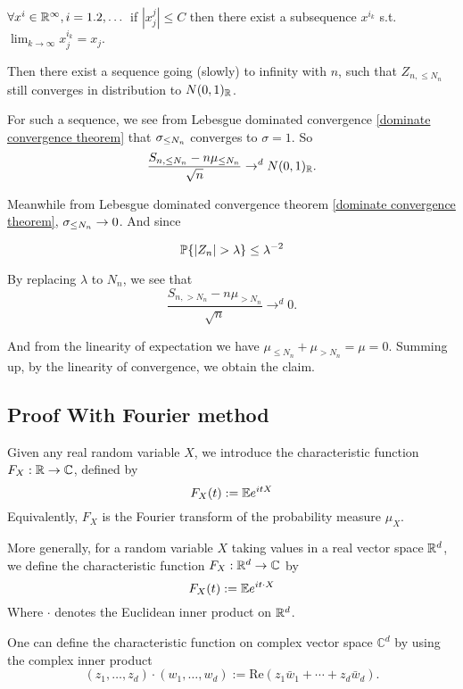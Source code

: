 \begin{lemma}
    $\forall x^i \in \mathbb{R}^\infty,i=1.2,\dots$ if $|x^j_j| \leq C$ then there exist a subsequence $x^{i_k}$ s.t. $\lim_{k\to \infty} x^{i_{k}}_j =x_j$.
\end{lemma}

Then there exist a sequence going (slowly) to infinity with $n$, such that $Z_{n,\leq N_n}$ still converges in distribution to $N(0,1)_{\mathbb{R}}$. 

For such a sequence, we see from Lebesgue dominated convergence \ref{dominate convergence theorem} that $\sigma_{\leq N_n}$ converges to $\sigma=1$. So 
\begin{equation*}
    \frac{S_{n,\leq N_n}-n\mu_{\leq N_n}}{\sqrt{n}} \to^d N(0,1)_{\mathbb{R}}.
\end{equation*}

Meanwhile from Lebesgue dominated convergence theorem \ref{dominate convergence theorem}, $\sigma_{\leq N_n}\to 0$. And since 

\begin{equation*}
    \Pb\{|Z_n|>\lambda\} \leq \lambda^{-2}
\end{equation*}

By replacing $\lambda$ to $N_n$, we see that
\begin{equation*}
    \frac{S_{n,> N_n}-n\mu_{>N_n}}{\sqrt{n}} \to^d 0.
\end{equation*}

And from the linearity of expectation we have $\mu_{\leq N_n}+\mu_{>N_n} =\mu =0$. Summing up, by the linearity of convergence, we obtain the claim. 


\subsection{Proof With Fourier method}

\begin{definition}
    Given any real random variable $X$, we introduce the characteristic function $F_X : \mathbb{R} \to \mathbb C$, defined by 
    \begin{equation}\label{characteristic function}
        F_X(t) := \mathbb{E} e^{itX}
    \end{equation}
    Equivalently, $F_X$ is the Fourier transform of the probability measure $\mu_X$.
    
    More generally, for a random variable $X$ taking values in a real vector space $\mathbb{R}^d$, we define the characteristic function $F_X :\mathbb{R}^d \to \mathbb C$ by 
    \begin{equation}
        F_X(t) := \mathbb{E} e^{it\cdot X}
    \end{equation}
    Where $\cdot$ denotes the Euclidean inner product on $\mathbb{R}^d$.

    One can define the characteristic function on complex vector space $\mathbb C^d$ by using the complex inner product
    \begin{equation*}
        (z_1,\dots,z_d)\cdot(w_1,\dots,w_d) := \mathrm{Re} (z_1\bar w_1+\cdots +z_d \bar w_d).
    \end{equation*}
\end{definition}

